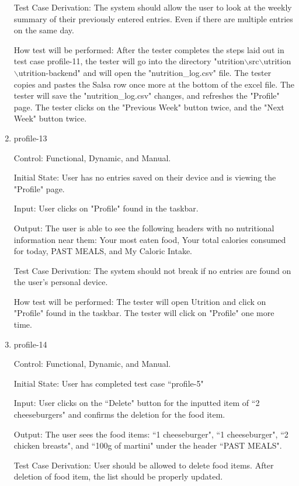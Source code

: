 \documentclass[12pt, titlepage]{article}
\begin{document}
\begin{enumerate}
		Test Case Derivation: The system should allow the user to look at the weekly summary of their previously entered entries. Even if there are multiple entries on the same day.
		
		How test will be performed: After the tester completes the steps laid out in test case profile-11, the tester will go into the directory "utrition$\backslash$src$\backslash$utrition$\backslash$utrition-backend" and will open the "nutrition\_log.csv" file. The tester copies and pastes the Salsa row once more at the bottom of the excel file. The tester will save the "nutrition\_log.csv" changes, and refreshes the "Profile" page. The tester clicks on the "Previous Week" button twice, and the "Next Week" button twice.
		
		\item{profile-13\\}
		
		Control: Functional, Dynamic, and Manual.
		
		Initial State: User has no entries saved on their device and is viewing the "Profile" page.
		
		Input: User clicks on "Profile" found in the taskbar.
		
		Output: The user is able to see the following headers with no nutritional information near them: Your most eaten food, Your total calories consumed for today, PAST MEALS, and My Caloric Intake.
		
		Test Case Derivation: The system should not break if no entries are found on the user's personal device.
		
		How test will be performed: The tester will open Utrition and click on "Profile" found in the taskbar. The tester will click on "Profile" one more time.
		
		\item{profile-14\\}
		
		Control: Functional, Dynamic, and Manual.
		
		Initial State: User has completed test case ``profile-5"
		
		Input: User clicks on the ``Delete" button for the inputted item of ``2 cheeseburgers" and confirms the deletion for the food item.
		
		Output: The user sees the food items: ``1 cheeseburger", ``1 cheeseburger", ``2 chicken breasts", and ``100g of martini" under the header ``PAST MEALS".
		
		Test Case Derivation: User should be allowed to delete food items. After deletion of food item, the list should be properly updated.
		

\end{enumerate}
\end{document}
